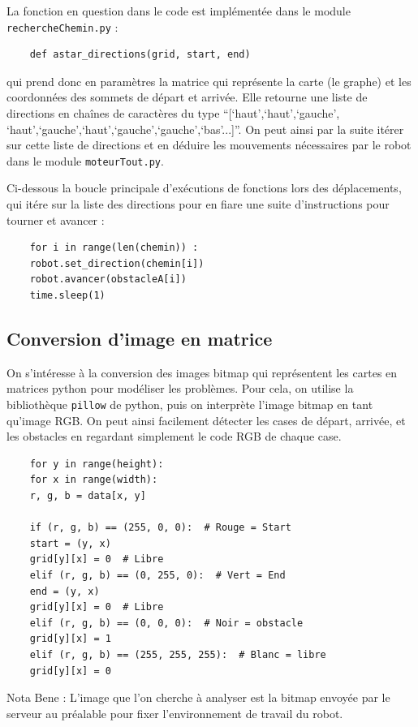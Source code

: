 \documentclass[a4paper,12pt]{report}  %
\begin{document}
La fonction en question dans le code est implémentée dans le module \texttt{rechercheChemin.py} : 
\begin{lstlisting}
	def astar_directions(grid, start, end)
\end{lstlisting}

qui prend donc en paramètres la matrice qui représente la carte (le graphe) et les coordonnées des sommets de départ et arrivée. Elle retourne une liste de directions en chaînes de caractères du type “[‘haut’,‘haut’,‘gauche’, ‘haut’,‘gauche’,‘haut’,‘gauche’,‘gauche’,‘bas’...]”. On peut ainsi par la suite itérer sur cette liste de directions et en déduire les mouvements nécessaires par le robot dans le module \texttt{moteurTout.py}.

Ci-dessous la boucle principale d’exécutions de fonctions lors des déplacements, qui itére sur la liste des directions pour en fiare une suite d’instructions pour tourner et avancer :
\begin{lstlisting}
	for i in range(len(chemin)) :
	robot.set_direction(chemin[i])
	robot.avancer(obstacleA[i])
	time.sleep(1)
\end{lstlisting}

\subsection{Conversion d’image en matrice}
On s'intéresse à la conversion des images bitmap qui représentent les cartes en matrices python pour modéliser les problèmes. Pour cela, on utilise la bibliothèque \texttt{pillow} de python, puis on interprète l’image bitmap en tant qu’image RGB. On peut ainsi facilement détecter les cases de départ, arrivée, et les obstacles en regardant simplement le code RGB de chaque case.

\begin{lstlisting}
	for y in range(height):
	for x in range(width):
	r, g, b = data[x, y]
	
	if (r, g, b) == (255, 0, 0):  # Rouge = Start
	start = (y, x)
	grid[y][x] = 0  # Libre
	elif (r, g, b) == (0, 255, 0):  # Vert = End
	end = (y, x)
	grid[y][x] = 0  # Libre
	elif (r, g, b) == (0, 0, 0):  # Noir = obstacle
	grid[y][x] = 1
	elif (r, g, b) == (255, 255, 255):  # Blanc = libre
	grid[y][x] = 0
\end{lstlisting}


Nota Bene : L’image que l’on cherche à analyser est la bitmap envoyée par le serveur au préalable pour fixer l’environnement de travail du robot.
\end{document}
